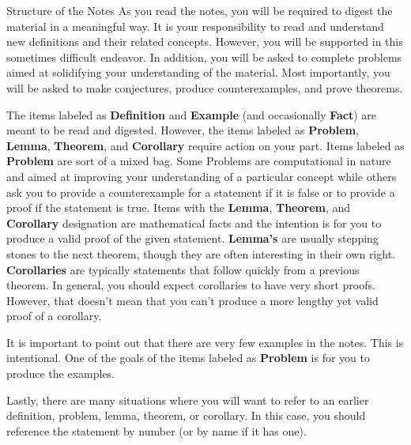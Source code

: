 \begin{section}{Structure of the Notes}
As you read the notes, you will be required to digest the material in a meaningful way.  It is your responsibility to read and understand new definitions and their related concepts.  However, you will be supported in this sometimes difficult endeavor. In addition, you will be asked to complete problems aimed at solidifying your understanding of the material.  Most importantly, you will be asked to make conjectures, produce counterexamples, and prove theorems.

The items labeled as \textbf{Definition} and \textbf{Example} (and occasionally \textbf{Fact}) are meant to be read and digested.  However, the items labeled as \textbf{Problem}, \textbf{Lemma}, \textbf{Theorem}, and \textbf{Corollary} require action on your part.  Items labeled as \textbf{Problem} are sort of a mixed bag. Some Problems are computational in nature and aimed at improving your understanding of a particular concept while others ask you to provide a counterexample for a statement if it is false or to provide a proof if the statement is true. Items with the \textbf{Lemma}, \textbf{Theorem}, and \textbf{Corollary} designation are mathematical facts and the intention is for you to produce a valid proof of the given statement.  \textbf{Lemma's} are usually stepping stones to the next theorem, though they are often  interesting in their own right. \textbf{Corollaries}  are typically statements that follow quickly from a previous theorem. In general, you should expect corollaries to have very short proofs.  However, that doesn't mean that you can't produce a more lengthy yet valid proof of a corollary. 

It is important to point out that there are very few examples in the notes.  This is intentional.  One of the goals of the items labeled as \textbf{Problem} is for you to produce the examples.

Lastly, there are many situations where you will want to refer to an earlier definition, problem, lemma, theorem, or corollary.  In this case, you should reference the statement by number (or by name if it has one).  
\end{section}
